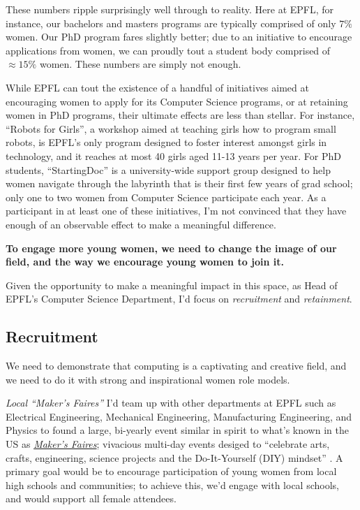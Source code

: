 \documentclass[acmtocl]{acmtrans2m}
\begin{document}
These numbers ripple surprisingly well through to reality. Here at EPFL, for
instance, our bachelors and masters programs are typically comprised of only
\href{http://www.swissict.ch/fileadmin/award/Impressionen/Symposium/WillyZwaenepoel\_ICT-Akademie.pdf}{$7\%$}~\cite{Willy}
women. Our PhD program fares slightly better; due to an initiative to
encourage applications from women, we can proudly tout a student body
comprised of $\approx15\%$ women. These numbers are simply not enough.

While EPFL can tout the existence of a handful of initiatives aimed at
encouraging women to apply for its Computer Science programs, or at retaining
women in PhD programs, their ultimate effects are less than stellar. For
instance, ``Robots for Girls'', a workshop aimed at teaching girls how to
program small robots, is EPFL's only program designed to foster interest
amongst girls in technology,
and it reaches at most 40 girls aged 11-13 years per year.
For PhD students, ``StartingDoc'' is a university-wide support group designed
to help women navigate through the labyrinth that is their first few years of
grad school; only one to two women from Computer Science participate each year.
As a participant in at least one of these initiatives, I'm not convinced that
they have enough of an observable effect to make a meaningful difference.


\textbf{To engage more young women, we need to change the image of our field,
and the way we encourage young women to join it.}

Given the opportunity to make a meaningful impact in this space, as Head
of EPFL's Computer Science Department, I'd focus on \textit{recruitment} and
\textit{retainment}.

\vspace{-0.15in}
\subsection*{\textbf{Recruitment}}
\vspace{-0.1in}
We need to demonstrate that computing is a captivating and creative field, and
we need to do it with strong and inspirational women role models.

\textit{\textsf{Local ``Maker's Faires''}}\newline
I'd team up with other departments at EPFL such as Electrical Engineering,
Mechanical Engineering, Manufacturing Engineering, and Physics to found a
large, {bi-yearly} event similar in spirit to what's known in the US as
\href{http://news.cnet.com/8301-13772_3-9935358-52.html}{\textit{Maker's
Faires}}; vivacious multi-day events desiged to ``celebrate arts, crafts,
engineering, science projects and the Do-It-Yourself (DIY) mindset''
\cite{MakerFaire}. A primary goal would be to encourage participation of
young women from local high schools and communities; to achieve this, we'd
engage with local schools, and would support all female attendees.
\end{document}
